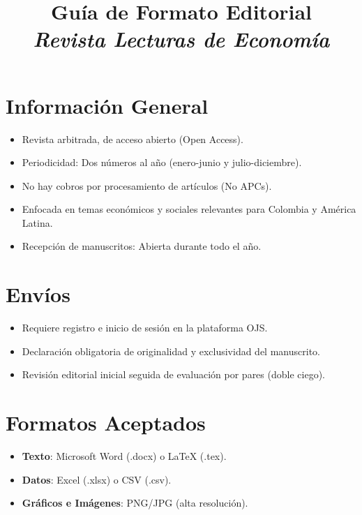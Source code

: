 \documentclass[12pt]{article}
\title{\textbf{Guía de Formato Editorial}\\\textit{Revista Lecturas de Economía}}
\author{}
\date{}
\begin{document}
\maketitle
\thispagestyle{empty}
\doublespacing

\section{Información General}
\begin{itemize}
  \item Revista arbitrada, de acceso abierto (Open Access).
  \item Periodicidad: Dos números al año (enero-junio y julio-diciembre).
  \item No hay cobros por procesamiento de artículos (No APCs).
  \item Enfocada en temas económicos y sociales relevantes para Colombia y América Latina.
  \item Recepción de manuscritos: Abierta durante todo el año.
\end{itemize}

\section{Envíos}
\begin{itemize}
  \item Requiere registro e inicio de sesión en la plataforma OJS.
  \item Declaración obligatoria de originalidad y exclusividad del manuscrito.
  \item Revisión editorial inicial seguida de evaluación por pares (doble ciego).
\end{itemize}

\section{Formatos Aceptados}
\begin{itemize}
  \item \textbf{Texto}: Microsoft Word (.docx) o LaTeX (.tex).
  \item \textbf{Datos}: Excel (.xlsx) o CSV (.csv).
  \item \textbf{Gráficos e Imágenes}: PNG/JPG (alta resolución).
\end{itemize}
\end{document}
